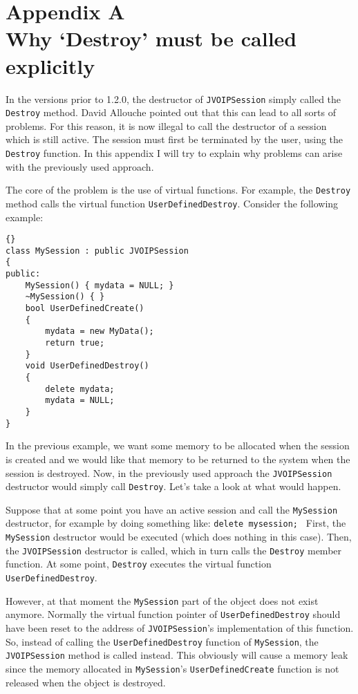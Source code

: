 \chapter*{Appendix A\\\vspace{0.9cm}Why `Destroy' must be called explicitly}

In the versions prior to 1.2.0, the destructor of {\tt JVOIPSession} simply
called the {\tt Destroy} method. David Allouche pointed out that this can 
lead to all sorts of problems. For
this reason, it is now illegal to call the destructor of a session which
is still active. The session must first be terminated by the user, using
the {\tt Destroy} function.
In this appendix I will try to explain why problems can arise with the
previously used approach. 

The core of the problem is the use of virtual functions. For example,
the {\tt Destroy} method calls the virtual function {\tt UserDefinedDestroy}.
Consider the following example:

	\begin{lstlisting}[frame=tb]{}
class MySession : public JVOIPSession
{
public:
	MySession() { mydata = NULL; }
	~MySession() { }
	bool UserDefinedCreate()
	{
		mydata = new MyData();
		return true;
	}
	void UserDefinedDestroy()
	{
		delete mydata;
		mydata = NULL;
	}
}
\end{lstlisting}

In the previous example, we want some memory to be allocated when the session is 
created and we would like that memory to be returned to the system when the 
session is destroyed. Now, in the previously used approach the {\tt JVOIPSession}
destructor would simply call {\tt Destroy}. Let's take a look at what would happen.

Suppose that at some point you have an active session and call the {\tt MySession}
destructor, for example by doing something like: {\tt delete mysession; }
First, the {\tt MySession} destructor would be executed (which does nothing in this
case). Then, the {\tt JVOIPSession} destructor is called, which in turn calls the
{\tt Destroy} member function. At some point, {\tt Destroy} executes the virtual
function {\tt UserDefinedDestroy}.

However, at that moment the {\tt MySession} part of the object does not exist anymore.
Normally the virtual function pointer of {\tt UserDefinedDestroy} should have been
reset to the address of {\tt JVOIPSession}'s implementation of this function. So,
instead of calling the {\tt User\-Defined\-Destroy} function of {\tt MySession},
the {\tt JVOIPSession} method is called instead. This obviously will cause a
memory leak since the memory allocated in {\tt MySession}'s {\tt User\-Defined\-Create}
function is not released when the object is destroyed.

